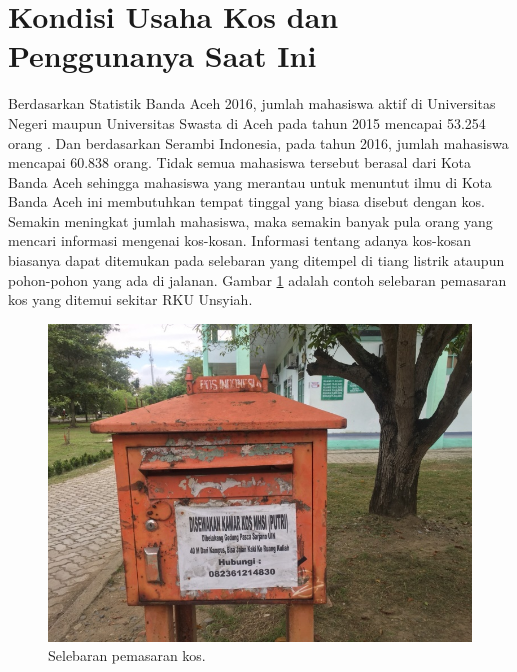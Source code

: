 \section{Kondisi Usaha Kos dan Penggunanya Saat Ini}
Berdasarkan Statistik Banda Aceh 2016, jumlah mahasiswa aktif di Universitas Negeri maupun Universitas Swasta di Aceh pada tahun 2015 mencapai 53.254 orang \citep{bappeda2016}. Dan berdasarkan Serambi Indonesia, pada tahun 2016, jumlah mahasiswa mencapai 60.838 orang. Tidak semua mahasiswa tersebut berasal dari Kota Banda Aceh sehingga mahasiswa yang merantau untuk menuntut ilmu di Kota Banda Aceh ini membutuhkan tempat tinggal yang biasa disebut dengan kos. Semakin meningkat jumlah mahasiswa, maka semakin banyak pula orang yang mencari informasi mengenai kos-kosan. Informasi tentang adanya kos-kosan biasanya dapat ditemukan pada selebaran yang ditempel di tiang listrik ataupun pohon-pohon yang ada di jalanan. Gambar \ref{selebarankos} adalah contoh selebaran pemasaran kos yang ditemui sekitar RKU Unsyiah.
 
  \begin{figure}[H]
  	\centering
  	\includegraphics[scale=1.2]{gambar/selebaran}
  	\caption{Selebaran pemasaran kos.}
  	\label{selebarankos}
  \end{figure}


